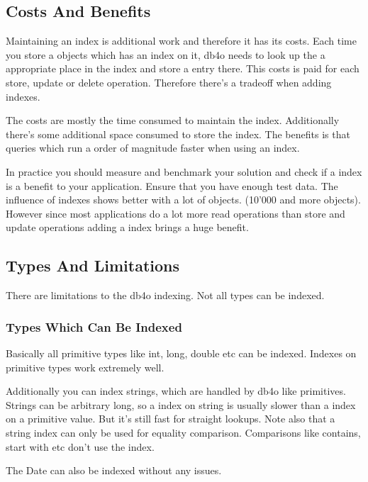 \subsection{Costs And Benefits}
\label{ref:basics-indexing-costs-and-benefits}

Maintaining an index is additional work and therefore it has its costs. Each time you store a objects which has an index on it, db4o needs to look up the a appropriate place in the index and store a entry there. This costs is paid for each store, update or delete operation. Therefore there's a tradeoff when adding indexes.

The costs are mostly the time consumed to maintain the index. Additionally there's some additional space consumed to store the index. The benefits is that queries which run a order of magnitude faster when using an index.

In practice you should measure and benchmark your solution and check if a index is a benefit to your application. Ensure that you have enough test data. The influence of indexes shows better with a lot of objects. (10'000 and more objects). However since most applications do a lot more read operations than store and update operations adding a index brings a huge benefit.

\subsection{Types And Limitations}
\label{ref:basics-indexing-types-and-limitations}

There are limitations to the db4o indexing. Not all types can be indexed.

\subsubsection*{Types Which Can Be Indexed}

Basically all primitive types like int, long, double etc can be indexed. Indexes on primitive types work extremely well.

Additionally you can index strings, which are handled by db4o like primitives. Strings can be arbitrary long, so a index on string is usually slower than a index on a primitive value. But it's still fast for straight lookups. Note also that a string index can only be used for equality comparison. Comparisons like contains, start with etc don't use the index.

The Date  can also be indexed without any issues.

